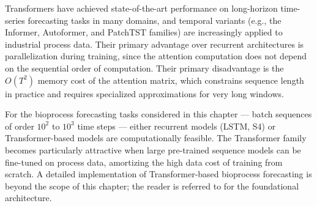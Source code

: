 Transformers have achieved state-of-the-art performance on long-horizon time-series
forecasting tasks in many domains, and temporal variants (e.g., the Informer,
Autoformer, and PatchTST families) are increasingly applied to industrial process
data.  Their primary advantage over recurrent architectures is parallelization
during training, since the attention computation does not depend on the sequential
order of computation.  Their primary disadvantage is the $O(T^2)$ memory cost
of the attention matrix, which constrains sequence length in practice and requires
specialized approximations for very long windows.

For the bioprocess forecasting tasks considered in this chapter --- batch sequences
of order $10^2$ to $10^3$ time steps --- either recurrent models (LSTM, S4) or
Transformer-based models are computationally feasible.  The Transformer family
becomes particularly attractive when large pre-trained sequence models can be
fine-tuned on process data, amortizing the high data cost of training from
scratch.  A detailed implementation of Transformer-based bioprocess forecasting
is beyond the scope of this chapter; the reader is referred to
\cite{Vaswani2017} for the foundational architecture.
